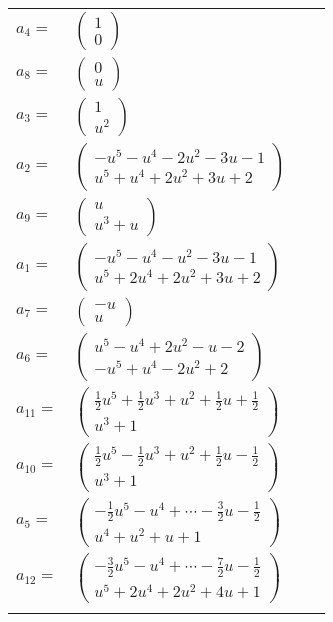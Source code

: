 \documentclass[1p]{elsarticle_modified}
\theoremstyle{definition}
\begin{document}
\begin{tabular}{m{7pt} m{180pt} m{7pt} m{180pt} }
\flushright $a_{4}=$&$\begin{pmatrix}1\\0\end{pmatrix}$ \\
\flushright $a_{8}=$&$\begin{pmatrix}0\\u\end{pmatrix}$ \\
\flushright $a_{3}=$&$\begin{pmatrix}1\\u^2\end{pmatrix}$ \\
\flushright $a_{2}=$&$\begin{pmatrix}- u^5- u^4-2 u^2-3 u-1\\u^5+u^4+2 u^2+3 u+2\end{pmatrix}$ \\
\flushright $a_{9}=$&$\begin{pmatrix}u\\u^3+u\end{pmatrix}$ \\
\flushright $a_{1}=$&$\begin{pmatrix}- u^5- u^4- u^2-3 u-1\\u^5+2 u^4+2 u^2+3 u+2\end{pmatrix}$ \\
\flushright $a_{7}=$&$\begin{pmatrix}- u\\u\end{pmatrix}$ \\
\flushright $a_{6}=$&$\begin{pmatrix}u^5- u^4+2 u^2- u-2\\- u^5+u^4-2 u^2+2\end{pmatrix}$ \\
\flushright $a_{11}=$&$\begin{pmatrix}\frac{1}{2} u^5+\frac{1}{2} u^3+u^2+\frac{1}{2} u+\frac{1}{2}\\u^3+1\end{pmatrix}$ \\
\flushright $a_{10}=$&$\begin{pmatrix}\frac{1}{2} u^5-\frac{1}{2} u^3+u^2+\frac{1}{2} u-\frac{1}{2}\\u^3+1\end{pmatrix}$ \\
\flushright $a_{5}=$&$\begin{pmatrix}-\frac{1}{2} u^5- u^4+\cdots-\frac{3}{2} u-\frac{1}{2}\\u^4+u^2+u+1\end{pmatrix}$ \\
\flushright $a_{12}=$&$\begin{pmatrix}-\frac{3}{2} u^5- u^4+\cdots-\frac{7}{2} u-\frac{1}{2}\\u^5+2 u^4+2 u^2+4 u+1\end{pmatrix}$\\&\end{tabular}
\end{document}
